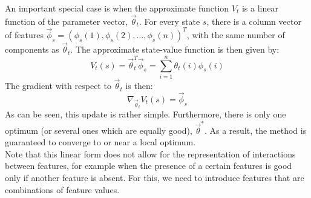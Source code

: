 An important special case is when the approximate function $V_t$ is a linear function of the parameter vector, $\overrightarrow{\theta}_t$. For every state $s$, there is a column vector of features $\overrightarrow{\phi}_s = (\phi_s(1), \phi_s(2), \dots, \phi_s(n))^T$, with the same number of components as $\overrightarrow{\theta}_t$. The approximate state-value function is then given by:
\begin{equation}
V_t(s) = \overrightarrow{\theta}_t^T \overrightarrow{\phi}_s = \sum_{i=1}^n \theta_t(i) \phi_s(i)
\end{equation}
The gradient with respect to $\overrightarrow{\theta}_t$ is then:
\begin{equation}
\nabla_{\overrightarrow{\theta}_t} V_t(s) = \overrightarrow{\phi}_s
\end{equation}
As can be seen, this update is rather simple. Furthermore, there is only one optimum (or several ones which are equally good), $\overrightarrow{\theta}^{*}$. As a result, the method is guaranteed to converge to or near a local optimum.\\
Note that this linear form does not allow for the representation of interactions between features, for example when the presence of a certain features is good only if another feature is absent. For this, we need to introduce features that are combinations of feature values.\\

